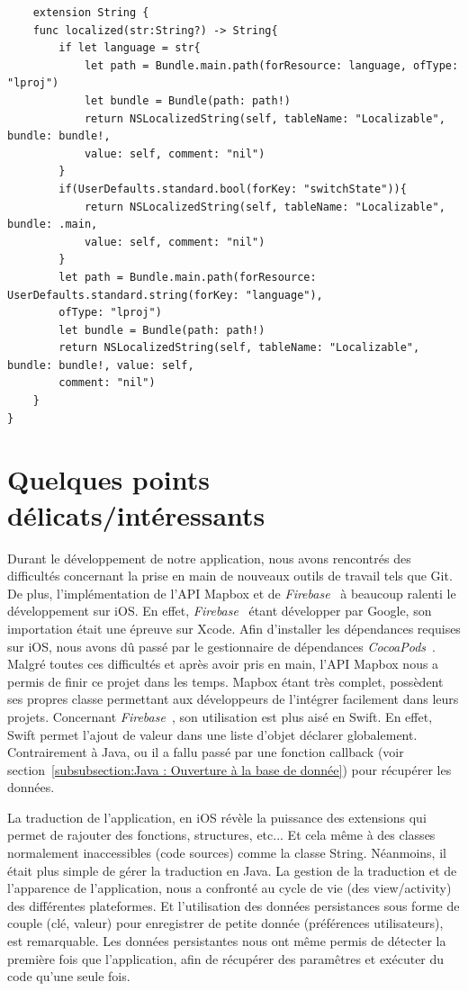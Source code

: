 \documentclass{article}
\begin{document}
\begin{verbatim}
    extension String {
    func localized(str:String?) -> String{
        if let language = str{
            let path = Bundle.main.path(forResource: language, ofType: "lproj")
            let bundle = Bundle(path: path!)
            return NSLocalizedString(self, tableName: "Localizable", bundle: bundle!,
            value: self, comment: "nil")
        }
        if(UserDefaults.standard.bool(forKey: "switchState")){
            return NSLocalizedString(self, tableName: "Localizable", bundle: .main,
            value: self, comment: "nil")
        }
        let path = Bundle.main.path(forResource: UserDefaults.standard.string(forKey: "language"), 
        ofType: "lproj")
        let bundle = Bundle(path: path!)
        return NSLocalizedString(self, tableName: "Localizable", bundle: bundle!, value: self,
        comment: "nil")
    }
}  
\end{verbatim}


\newpage %


\section{Quelques points délicats/intéressants}

Durant le développement de notre application, nous avons rencontrés des difficultés concernant la prise en main
de nouveaux outils de travail tels que Git.
De plus, l'implémentation de l'API Mapbox et de \textit{Firebase}~\cite{firebaseDoc} à beaucoup ralenti
le développement sur iOS. En effet, \textit{Firebase}~\cite{firebaseDoc} étant développer par Google, son importation
était une épreuve sur Xcode. Afin d'installer les dépendances requises sur iOS, nous avons dû passé par
le gestionnaire de dépendances \textit{CocoaPods}~\cite{cocoapodsDoc}.
Malgré toutes ces difficultés et après avoir pris en main, l'API Mapbox nous a permis de finir ce projet dans les temps.
Mapbox étant très complet, possèdent ses propres classe permettant aux développeurs de l'intégrer facilement dans leurs projets.
Concernant \textit{Firebase}~\cite{firebaseDoc}, son utilisation est plus aisé en Swift. En effet, Swift permet
l'ajout de valeur dans une liste d'objet déclarer globalement. Contrairement à Java, ou il a fallu passé par une
fonction callback (voir section~\ref{subsubsection:Java : Ouverture à la base de donnée}) pour récupérer les données.

La traduction de l'application, en iOS révèle la puissance des extensions qui permet de rajouter des fonctions, structures, etc...
Et cela même à des classes normalement inaccessibles (code sources) comme la classe String. Néanmoins, il était plus simple de gérer la traduction en Java.
La gestion de la traduction et de l'apparence de l'application, nous a confronté au cycle de vie (des view/activity) des différentes plateformes.
Et l'utilisation des données persistances sous forme de couple (clé, valeur) pour enregistrer de petite donnée (préférences utilisateurs), est remarquable.
Les données persistantes nous ont même permis de détecter la première fois que l'application, afin de récupérer des paramêtres et exécuter du code qu'une seule fois.
\end{document}
